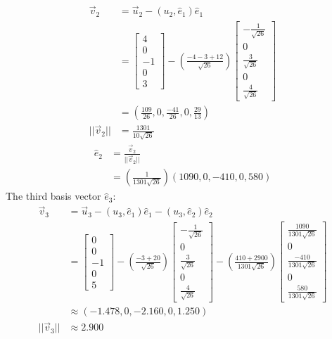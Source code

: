 \documentclass[11pt]{homework}
\begin{document}
\begin{align*}
\vec v_2 &= \vec u_2 - (u_2, \hat{e}_1) \hat{e}_1 \\
         &= \begin{bmatrix}
             4 \\   
             0 \\   
            -1 \\  
             0 \\
             3
            \end{bmatrix}
            - (\frac{-4 -3 +12}{\sqrt{26}})
            \begin{bmatrix}
            -\frac{1}{\sqrt{26}} \\
            0 \\
            \frac{3}{\sqrt{26}} \\
            0 \\
             \frac{4}{\sqrt{26}} 
            \end{bmatrix} \\
         &= (\frac{109}{26}, 0,  \frac{-41}{26}, 0, \frac{29}{13}) \\
||\vec v_2|| &= \frac{1301}{10 \sqrt{26}}
\end{align*}
\begin{align*}
\hat{e}_2 &= \frac{\vec v_2}{||\vec v_2||} \\
          &= (\frac{1}{1301 \sqrt{26}})(1090, 0, -410, 0, 580)
\end{align*}
The third basis vector $\hat{e}_3$:
\begin{align*}
\vec v_3 &= \vec u_3 - (u_3, \hat{e}_1) \hat{e}_1  - (u_3, \hat{e}_2)\hat{e}_2 \\
         &= \begin{bmatrix}
             0 \\   
             0 \\   
            -1 \\  
             0 \\
             5
            \end{bmatrix}
            - (\frac{-3+20}{\sqrt{26}})
            \begin{bmatrix}
              -\frac{1}{\sqrt{26}} \\
              0 \\
              \frac{3}{\sqrt{26}} \\
              0 \\
               \frac{4}{\sqrt{26}} 
            \end{bmatrix}
            - (\frac{410+2900}{1301\sqrt{26}})
            \begin{bmatrix}
              \frac{1090}{1301\sqrt{26}} \\
              0 \\
              \frac{-410}{1301\sqrt{26}} \\
              0 \\
               \frac{580}{1301\sqrt{26}} 
            \end{bmatrix} \\
         &\approx (-1.478, 0, -2.160, 0, 1.250) \\
||\vec v_3|| &\approx 2.900
\end{align*}
\end{document}

